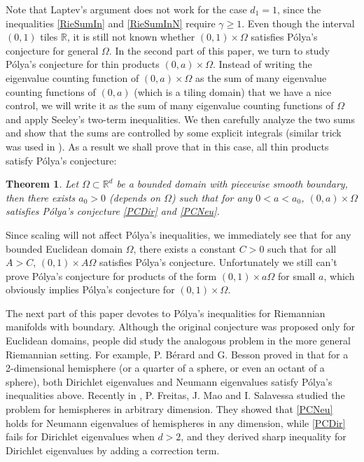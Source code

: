 \documentclass[11pt,letterpaper]{amsart}
\numberwithin{equation}{section}
\theoremstyle{plain}
\newtheorem{theorem}{Theorem}[section]
\theoremstyle{plain}
\numberwithin{equation}{section}
\theoremstyle{remark}
\begin{document}
	
	Note that Laptev's argument does not work for the case $d_1=1$, since the inequalities \eqref{RieSumIn} and \eqref{RieSumInN} require $\gamma \ge 1$. Even though the interval $(0,1)$ tiles $\mathbb R$, it is still not known whether $(0,1) \times \Omega$ satisfies P\'olya's conjecture for general $\Omega$. In the second part of this paper, we turn to study  P\'olya's conjecture for thin products $(0,a)\times \Omega$. 
	Instead of writing the eigenvalue counting function of $(0,a)\times \Omega$ as the sum of many  eigenvalue counting functions of $(0,a)$ (which is a tiling domain) that we have a nice control, we will write it as the sum of many  eigenvalue counting functions of $\Omega$ and apply Seeley's two-term inequalities. We then carefully analyze the two sums and show that the sums are controlled by some  explicit integrals (similar trick was used in \cite{FLPS}). As a result we shall prove that in this case, all thin products satisfy P\'olya's conjecture:	
	\begin{theorem}\label{mthm}
		Let $\Omega \subset \mathbb{R}^d$ be a bounded domain with piecewise smooth boundary, then there exists $a_0>0$ (depends on $\Omega$) such that for any $0<a<a_0$, $(0,a)\times \Omega$ satisfies P\'olya's conjecture \eqref{PCDir} and \eqref{PCNeu}.
	\end{theorem}
	
	Since scaling will not affect  P\'olya's inequalities,  we immediately see that  for any bounded Euclidean domain $\Omega$, there exists a constant $C>0$ such that  for all $A>C$, $(0,1)\times A\Omega$ satisfies   P\'olya's conjecture. Unfortunately we still can't prove P\'olya's conjecture for   products of the form $(0,1) \times a\Omega$ for small $a$, which obviously implies P\'olya's conjecture for $(0,1) \times \Omega$. 
	
	
	The next part of this paper devotes to P\'olya's inequalities for Riemannian manifolds with boundary. Although the original conjecture was  proposed only for Euclidean domains, people did study the analogous problem in the more general Riemannian setting. For example, P. B\'erard and G. Besson proved in \cite{BB80} that for a 2-dimensional hemisphere (or a quarter of a sphere, or even an octant of a sphere), both Dirichlet eigenvalues and Neumann eigenvalues satisfy P\'olya's inequalities above. Recently in \cite{FMS22}, P. Freitas, J. Mao and I. Salavessa studied the problem for hemispheres in arbitrary dimension. They showed that \eqref{PCNeu} holds for Neumann eigenvalues of hemispheres in any dimension, while  \eqref{PCDir} fails for Dirichlet eigenvalues when $d > 2$, and they derived sharp inequality for Dirichlet eigenvalues by adding a correction term. 
	
\end{document}
